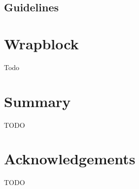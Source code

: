\documentclass[11pt]{article}
\begin{document}
\subsection{Guidelines}





\section{Wrapblock}
Todo

\section{Summary}
TODO

\section*{Acknowledgements}
TODO
\end{document}
